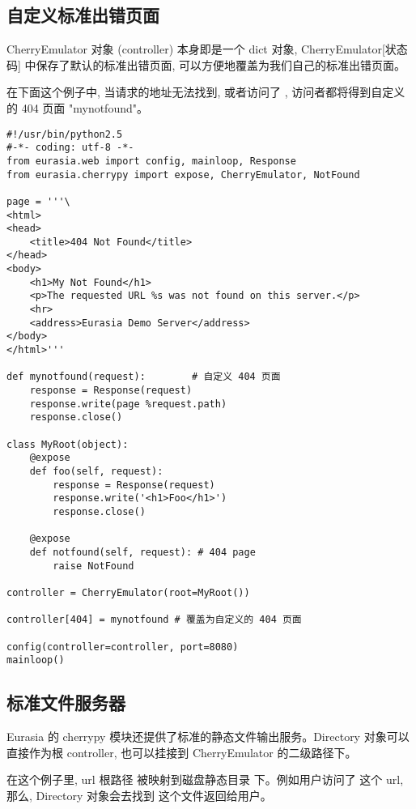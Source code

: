 \documentclass{manual}
\begin{document}

\subsection{自定义标准出错页面}

CherryEmulator 对象 (controller) 本身即是一个 dict 对象, CherryEmulator[状态码] 中保存了默认的标准出错页面, 可以方便地覆盖为我们自己的标准出错页面。

在下面这个例子中, 当请求的地址无法找到, 或者访问了 , 访问者都将得到自定义的 404 页面 "mynotfound"。

\begin{verbatim}
#!/usr/bin/python2.5
#-*- coding: utf-8 -*-
from eurasia.web import config, mainloop, Response
from eurasia.cherrypy import expose, CherryEmulator, NotFound

page = '''\
<html>
<head>
	<title>404 Not Found</title>
</head>
<body>
	<h1>My Not Found</h1>
	<p>The requested URL %s was not found on this server.</p>
	<hr>
	<address>Eurasia Demo Server</address>
</body>
</html>'''

def mynotfound(request):        # 自定义 404 页面
	response = Response(request)
	response.write(page %request.path)
	response.close()

class MyRoot(object):
	@expose
	def foo(self, request):
		response = Response(request)
		response.write('<h1>Foo</h1>')
		response.close()

	@expose
	def notfound(self, request): # 404 page
		raise NotFound

controller = CherryEmulator(root=MyRoot())

controller[404] = mynotfound # 覆盖为自定义的 404 页面

config(controller=controller, port=8080)
mainloop()
\end{verbatim}

\subsection{标准文件服务器}

Eurasia 的 cherrypy 模块还提供了标准的静态文件输出服务。Directory 对象可以直接作为根 controller, 也可以挂接到 CherryEmulator 的二级路径下。

在这个例子里, url 根路径 \file{/} 被映射到磁盘静态目录  下。例如用户访问了  这个 url, 那么, Directory 对象会去找到  这个文件返回给用户。
\end{document}
